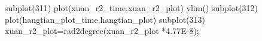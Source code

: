 subplot(311)
plot(xuan_r2_time,xuan_r2_plot)
ylim()
subplot(312)
plot(hangtian_plot_time,hangtian_plot)
subplot(313)
xuan_r2_plot=rad2degree(xuan_r2_plot *4.77E-8);
